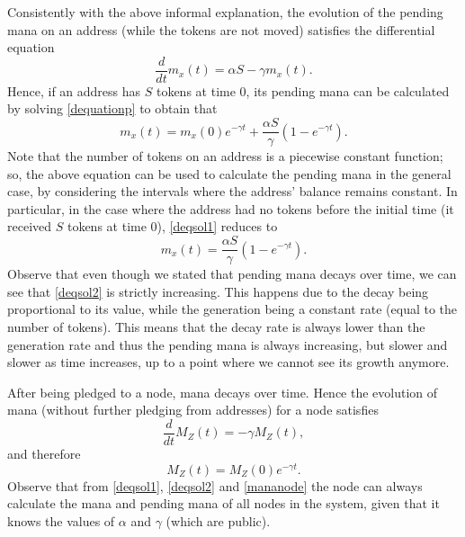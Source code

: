 \documentclass[../main.tex]{subfiles}
\begin{document}
Consistently with the above informal explanation,
the evolution of the pending mana on an address (while the tokens
are not moved)
satisfies the differential equation
 \begin{equation}
     \label{dequationp}\frac{d}{dt}m_x(t)=\alpha S -\gamma m_x(t).
 \end{equation}
Hence, if an address has $S$ tokens at time $0$, its pending mana can be calculated by solving \eqref{dequationp} to obtain that
\begin{equation}
   \label{deqsol1} m_x(t)=m_x(0)e^{-\gamma t}+\frac{\alpha S}{\gamma}(1-e^{-\gamma t}) .
\end{equation}
Note that the number of tokens on an address is a 
piecewise constant function; so, the above equation
can be used to calculate the pending mana in the general 
case, by considering the intervals where the address' balance
remains constant.
In particular, in the case where the address had no tokens before the initial time (it received $S$ tokens at time $0$), \eqref{deqsol1} reduces to
\begin{equation}
   \label{deqsol2} m_x(t)=\frac{\alpha S}{\gamma}(1-e^{-\gamma t}).
\end{equation}
Observe that even though we stated that pending mana decays over time, we can see that \eqref{deqsol2} is strictly increasing. This happens due to the decay being proportional to its value, while the generation being a constant rate (equal to the number of tokens). This means that the decay rate is always lower than the generation rate and thus the pending mana is always increasing, but slower and slower as time increases, up to a point where we cannot see its growth anymore. 

After being pledged to a node, mana decays over time. Hence the evolution of mana (without further pledging from addresses) for a node satisfies 
\[
\frac{d}{dt}M_Z(t)=-\gamma M_Z(t),
\]
and therefore
\begin{equation}
\label{mananode}M_Z(t)=M_Z(0) e^{-\gamma t}.
\end{equation}
Observe that from \eqref{deqsol1}, \eqref{deqsol2} and \eqref{mananode} the node can always calculate the mana and pending mana 
of all nodes in the system, given that it knows the values of $\alpha$ and $\gamma$
(which are public). 
\end{document}
